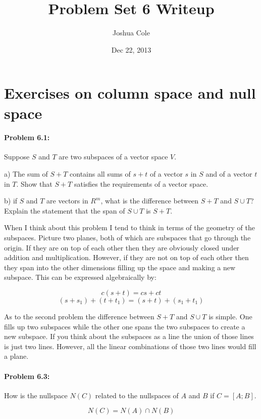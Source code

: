 \documentclass {article}
\begin{document}
\title {Problem Set 6 Writeup}
\author {Joshua Cole}
\date {Dec 22, 2013}
\maketitle
\section {Exercises on column space and null space}

\paragraph{Problem 6.1:}

Suppose $S$ and $T$ are two subspaces of a vector space $V$.

a) The sum of $S+T$ contains all sums of $s+t$ of a vector $s$ in $S$ and of a vector $t$ in $T$. Show that $S+T$ satisfies the requirements of a vector space.

b) if $S$ and $T$ are vectors in $R^m$, what is the difference between $S+T$ and $S \cup T$? Explain the statement that the span of $S \cup T$ is $S+T$.

When I think about this problem I tend to think in terms of the geometry of the subspaces. Picture two planes, both of which are subspaces that go through the origin. If they are on top of each other then they are obviously closed under addition and multiplication. However, if they are not on top of each other then they span into the other dimensions filling up the space and making a new subspace. This can be expressed algebraically by:

$$c(s+t) = cs + ct$$
$$(s+s_1) + (t+t_1) = (s+t)+(s_1+t_1)$$

As to the second problem the difference between $S+T$ and $S \cup T$ is simple. One fills up two subspaces while the other one spans the two subspaces to create a new subspace. If you think about the subspaces as a line the union of those lines is just two lines. However, all the linear combinations of those two lines would fill a plane.

\paragraph{Problem 6.3:}

How is the nullspace $N(C)$ related to the nullspaces of $A$ and $B$ if $C = [A;B]$.

$$N(C)=N(A) \cap N(B)$$
\end{document}
